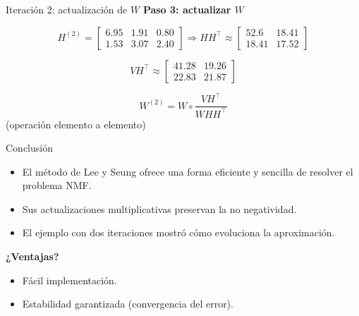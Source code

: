 \documentclass{beamer}
\begin{document}
\begin{frame}{Iteración 2: actualización de $ W $}
\textbf{Paso 3: actualizar $ W $}

\[
H^{(2)} =
\begin{bmatrix}
6.95 & 1.91 & 0.80 \\
1.53 & 3.07 & 2.40
\end{bmatrix}
\Rightarrow
H H^\top \approx
\begin{bmatrix}
52.6 & 18.41 \\
18.41 & 17.52
\end{bmatrix}
\]

\[
V H^\top \approx
\begin{bmatrix}
41.28 & 19.26 \\
22.83 & 21.87
\end{bmatrix}
\]

\[
W^{(2)} = W \circ \frac{V H^\top}{W H H^\top}
\]
(operación elemento a elemento)
\end{frame}

\begin{frame}{Conclusión}
\begin{itemize}
    \item El método de Lee y Seung ofrece una forma eficiente y sencilla de resolver el problema NMF.
    \item Sus actualizaciones multiplicativas preservan la no negatividad.
    \item El ejemplo con dos iteraciones mostró cómo evoluciona la aproximación.
\end{itemize}
\pause
\textbf{¿Ventajas?}
\begin{itemize}
    \item Fácil implementación.
    \item Estabilidad garantizada (convergencia del error).
\end{itemize}
\end{frame}
\end{document}

